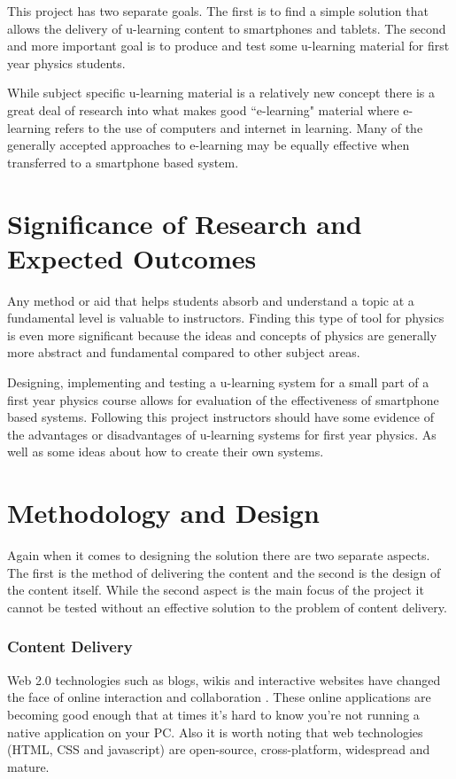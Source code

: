 \documentclass[12pt,a4paper]{article}  %
\begin{document}
This project has two separate goals. The first is to find a simple
solution that allows the delivery of u-learning content to smartphones
and tablets. The second and more important goal is to produce and test
some u-learning material for first year physics students.

While subject specific u-learning material is a relatively new concept
there is a great deal of research into what makes good ``e-learning"
material where e-learning refers to the use of computers and internet
in learning. Many of the generally accepted approaches to e-learning
may be equally effective when transferred to a smartphone based
system.

\section*{Significance of Research and Expected Outcomes}

Any method or aid that helps students absorb and understand a topic at
a fundamental level is valuable to instructors. Finding this type of
tool for physics is even more significant because the ideas and
concepts of physics are generally more abstract and fundamental
compared to other subject areas. 

Designing, implementing and testing a u-learning system for a small
part of a first year physics course allows for evaluation of the
effectiveness of smartphone based systems. Following this project
instructors should have some evidence of the advantages or
disadvantages of u-learning systems for first year physics. As well as
some ideas about how to create their own systems.

\section*{Methodology and Design}

Again when it comes to designing the solution there are two separate
aspects. The first is the method of delivering the content and the
second is the design of the content itself. While the second aspect is
the main focus of the project it cannot be tested without an effective
solution to the problem of content delivery.


\subsubsection*{Content Delivery}

Web 2.0 technologies such as blogs, wikis and interactive websites
have changed the face of online interaction and collaboration
\cite{procsmart}. These online applications are becoming good enough
that at times it's hard to know you're not running a native application
on your PC. Also it is worth noting that web technologies (HTML, CSS
and javascript) are open-source, cross-platform, widespread and mature. 
\end{document}
